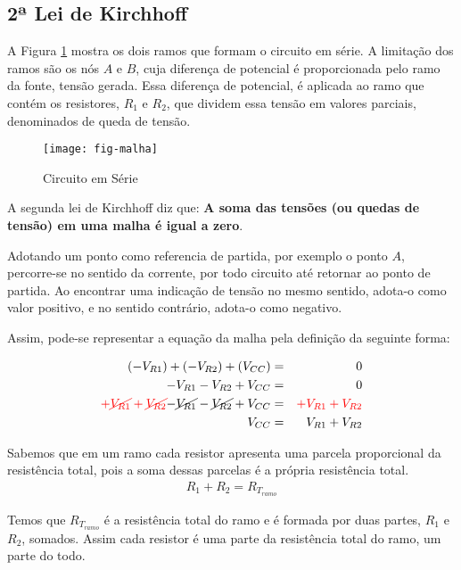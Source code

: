 
\subsection{2ª Lei de Kirchhoff}

A Figura \ref{fig:malha} mostra os dois ramos que formam o circuito em série.
A limitação dos ramos são os nós $A$ e $B$, cuja diferença de potencial é proporcionada pelo ramo da fonte, tensão gerada. Essa diferença de potencial, é aplicada ao ramo que contém os resistores, $R_1$ e $R_2$, que dividem essa tensão em valores parciais, denominados de queda de tensão.

\begin{figure}[!h]
	\centering
	\caption{Circuito em Série}
	\texttt{[image: fig-malha]}
	\label{fig:malha}
\end{figure}

A segunda lei de Kirchhoff diz que: \textbf{A soma das tensões (ou quedas de tensão) em uma malha é igual a zero}.

Adotando um ponto como referencia de partida, por exemplo o ponto $A$, percorre-se no sentido da corrente, por todo circuito até retornar ao ponto de partida. Ao encontrar uma indicação de tensão no mesmo sentido, adota-o como valor positivo, e no sentido contrário, adota-o como negativo.

Assim, pode-se representar a equação da malha pela definição da seguinte forma:

\begin{eqnarray}
	(-V_{R1}) + (-V_{R2}) + (V_{CC})  & = & 0 \\
	-V_{R1} - V_{R2} + V_{CC} & = & 0 \nonumber\\
	\color{red}{ + \cancel{ V_{R1} } + \cancel{ V_{R2} } } \color{black}{- \cancel{V_{R1}} } - \color{black}{\cancel{ V_{R2}} } + V_{CC} & = & \color{red}{+ V_{R1} + V_{R2}} \nonumber\\
	 V_{CC} & = & V_{R1} + V_{R2}
\end{eqnarray}


Sabemos que em um ramo cada resistor apresenta uma parcela proporcional da resistência total, pois a soma dessas parcelas é a própria resistência total.
\begin{eqnarray}
R_1 + R_2 = R_{T_{ramo}}
\end{eqnarray}

Temos que $R_{T_{ramo}}$ é a resistência total do ramo e é formada por duas partes, $R_1$ e $R_2$, somados. Assim cada resistor é uma parte da resistência total do ramo, um parte do todo.

